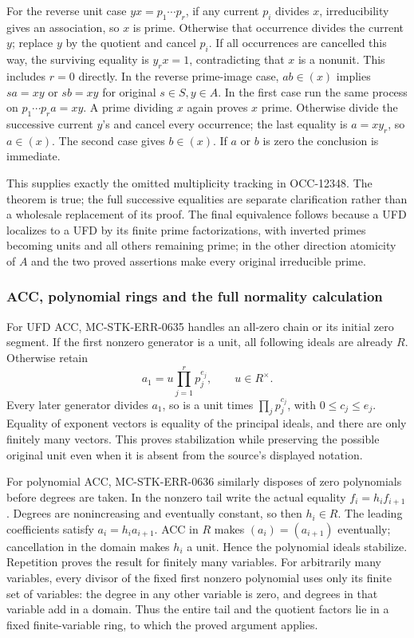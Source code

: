 For the reverse unit case \(yx=p_1\cdots p_r\), if any current \(p_i\) divides \(x\), irreducibility gives an association, so \(x\) is prime. Otherwise that occurrence divides the current \(y\); replace \(y\) by the quotient and cancel \(p_i\). If all occurrences are cancelled this way, the surviving equality is \(y_r x=1\), contradicting that \(x\) is a nonunit. This includes \(r=0\) directly. In the reverse prime-image case, \(ab\in(x)\) implies \(sa=xy\) or \(sb=xy\) for original \(s\in S,y\in A\). In the first case run the same process on \(p_1\cdots p_r a=xy\). A prime dividing \(x\) again proves \(x\) prime. Otherwise divide the successive current \(y\)'s and cancel every occurrence; the last equality is \(a=xy_r\), so \(a\in(x)\). The second case gives \(b\in(x)\). If \(a\) or \(b\) is zero the conclusion is immediate.

This supplies exactly the omitted multiplicity tracking in OCC-12348. The theorem is true; the full successive equalities are separate clarification rather than a wholesale replacement of its proof. The final equivalence follows because a UFD localizes to a UFD by its finite prime factorizations, with inverted primes becoming units and all others remaining prime; in the other direction atomicity of \(A\) and the two proved assertions make every original irreducible prime.

\subsubsection{ACC, polynomial rings and the full normality calculation}\label{acc-polynomial-rings-and-the-full-normality-calculation}

For UFD ACC, MC-STK-ERR-0635 handles an all-zero chain or its initial zero segment. If the first nonzero generator is a unit, all following ideals are already \(R\). Otherwise retain \[
 a_1=u\prod_{j=1}^r p_j^{e_j},\qquad u\in R^\times.
\] Every later generator divides \(a_1\), so is a unit times \(\prod_jp_j^{c_j}\), with \(0\le c_j\le e_j\). Equality of exponent vectors is equality of the principal ideals, and there are only finitely many vectors. This proves stabilization while preserving the possible original unit even when it is absent from the source's displayed notation.

For polynomial ACC, MC-STK-ERR-0636 similarly disposes of zero polynomials before degrees are taken. In the nonzero tail write the actual equality \(f_i=h_i f_{i+1}\). Degrees are nonincreasing and eventually constant, so then \(h_i\in R\). The leading coefficients satisfy \(a_i=h_i a_{i+1}\). ACC in \(R\) makes \((a_i)=(a_{i+1})\) eventually; cancellation in the domain makes \(h_i\) a unit. Hence the polynomial ideals stabilize. Repetition proves the result for finitely many variables. For arbitrarily many variables, every divisor of the fixed first nonzero polynomial uses only its finite set of variables: the degree in any other variable is zero, and degrees in that variable add in a domain. Thus the entire tail and the quotient factors lie in a fixed finite-variable ring, to which the proved argument applies.

